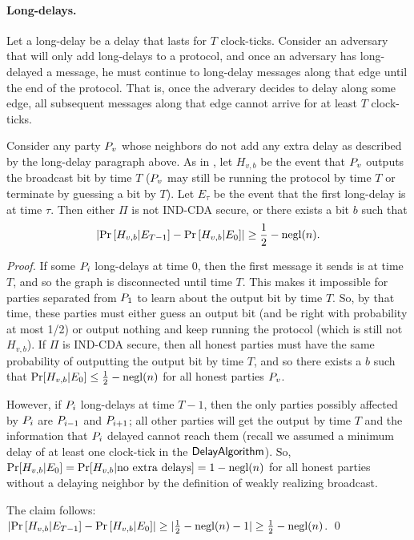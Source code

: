 \paragraph{Long-delays.} Let a long-delay be a delay that lasts for $T$ clock-ticks. Consider an adversary that will only add long-delays to a protocol, and once an adversary has long-delayed a message, he must continue to long-delay messages along that edge until the end of the protocol. That is, once the adverary decides to delay along some edge, all subsequent messages along that edge cannot arrive for at least $T$ clock-ticks.

\begin{claim}
	Consider any party $P_v$ whose neighbors do not add any extra delay as described by the long-delay paragraph above. As in \cite{MOR15}, let $H_{v,b}$ be the event that $P_v$ outputs the broadcast bit by time $T$ ($P_v$ may still be running the protocol by time $T$ or terminate by guessing a bit by $T$). 
	Let $E_\tau$ be the event that the first long-delay is at time $\tau$. Then either $\Pi$ is not IND-CDA secure, or there exists a bit $b$ such that 
	\[ \lvert \Pr \left[ H_{v,b} | E_{T-1} \right] - \Pr \left[ H_{v,b} | E_{0} \right] \rvert \geq \frac 1 2 - \text{negl}(n).\]
\end{claim}
\begin{proof}
	If some $P_i$ long-delays at time $0$, then the first message it sends is at time $T$, and so the graph is disconnected until time $T$. This makes it impossible for parties separated from $P_1$ to learn about the output bit by time $T$. So, by that time, these parties must either guess an output bit (and be right with probability at most 1/2) or output nothing and keep running the protocol (which is still not $H_{v,b}$). If $\Pi$ is IND-CDA secure, then all honest parties must have the same probability of outputting the output bit by time $T$, and so there exists a $b$ such that $\Pr[H_{v,b} | E_0] \leq \frac 1 2 - \text{negl}(n)$ for all honest parties $P_v$.
	
	However, if $P_i$ long-delays at time $T-1$, then the only parties possibly affected by $P_i$ are $P_{i-1}$ and $P_{i+1}$; all other parties will get the output by time $T$ and the information that $P_i$ delayed cannot reach them (recall we assumed a minimum delay of at least one clock-tick in the $\mathsf{DelayAlgorithm}$). So, $\Pr[H_{v,b} | E_0] = \Pr[H_{v,b} | \mbox{no extra delays}] = 1 - \text{negl}(n)$ for all honest parties without a delaying neighbor by the definition of weakly realizing broadcast.
	
	The claim follows: $\lvert \Pr \left[ H_{v,b} | E_{T-1} \right] - \Pr \left[ H_{v,b} | E_{0} \right] \rvert \geq \lvert \frac 1 2 - \text{negl}(n) - 1 
	\rvert \geq \frac 1 2 - \text{negl}(n)$.
	\qed
\end{proof}

